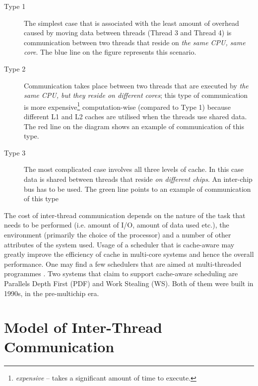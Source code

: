 \begin{description}
  \item[Type 1] The simplest case that is associated with the least amount of overhead caused by moving data between threads (Thread 3 and Thread 4) is communication between two threads that reside on \textit{the same CPU, same core}. The blue line on the figure represents this scenario.
  \item[Type 2] Communication takes place between two threads that are executed by \textit{the same CPU, but they reside on different cores}; this type of communication is more expensive\footnote{\textit{expensive} -- takes a significant amount of time to execute.} computation-wise (compared to Type 1) because different L1 and L2 caches are utilised when the threads use shared data. The red line on the diagram shows an example of communication of this type. 
  \item[Type 3] The most complicated case involves all three levels of cache. In this case data is shared between threads that reside \textit{on different chips}. An inter-chip bus has to be used. The green line points to an example of communication of this type
\end{description}

The cost of inter-thread communication depends on the nature of the task that needs to be performed (i.e. amount of I/O, amount of data used etc.), the environment (primarily the choice of the processor) and a number of other attributes of the system used. Usage of a scheduler that is cache-aware may greatly improve the efficiency of cache in multi-core systems and hence the overall performance. One may find a few schedulers that are aimed at multi-threaded programmes \cite{Zhuravlev2012,Liaskovitis2006,Chen2007}. Two systems that claim to support cache-aware scheduling are Parallels Depth First (PDF)\cite{Blelloch1999} and Work Stealing (WS)\cite{Blumofe1994}. Both of them were built in 1990s, in the pre-multichip era.

\section{Model of Inter-Thread Communication}
\label{modelsection}

